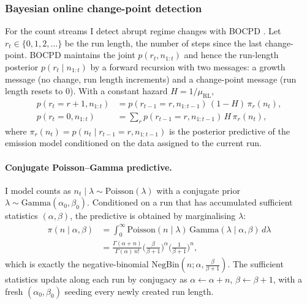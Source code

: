 \documentclass[10pt,twocolumn]{article}
\theoremstyle{definition}
\newcommand{\Pois}{\mathrm{Poisson}}
\newcommand{\Gam}{\mathrm{Gamma}}
\newcommand{\NB}{\mathrm{NegBin}}
\begin{document}
\subsubsection{Bayesian online change-point detection}
\label{sec:bocpd}
For the count streams I detect abrupt regime changes with BOCPD
\citep{adams2007}. Let $r_t\in\{0,1,2,\dots\}$ be the run length, the
number of steps since the last change-point. BOCPD maintains the joint
$p(r_t, n_{1:t})$ and hence the run-length posterior $p(r_t\mid n_{1:t})$ by a
forward recursion with two messages: a growth message (no change, run
length increments) and a change-point message (run length resets to $0$).
With a constant hazard $H=1/\mu_{\mathrm{RL}}$,
\begin{align}
p(r_t{=}r{+}1, n_{1:t}) &= p(r_{t-1}{=}r, n_{1:t-1})\,(1{-}H)\,\pi_r(n_t),\label{eq:growth}\\
p(r_t{=}0, n_{1:t}) &= \sum_{r} p(r_{t-1}{=}r, n_{1:t-1})\,H\,\pi_r(n_t),\label{eq:reset}
\end{align}
where $\pi_r(n_t)=p(n_t\mid r_{t-1}{=}r, n_{1:t-1})$ is the posterior predictive
of the emission model conditioned on the data assigned to the current run.

\paragraph{Conjugate Poisson--Gamma predictive.}
I model counts as $n_t\mid\lambda\sim\Pois(\lambda)$ with a conjugate prior
$\lambda\sim\Gam(\alpha_0,\beta_0)$. Conditioned on a run that has accumulated
sufficient statistics $(\alpha,\beta)$, the predictive is obtained by
marginalising $\lambda$:
\begin{align}
\pi(n\mid\alpha,\beta)
&= \int_0^\infty \Pois(n\mid\lambda)\,\Gam(\lambda\mid\alpha,\beta)\,d\lambda \nonumber\\
&= \frac{\Gamma(\alpha+n)}{\Gamma(\alpha)\,n!}\Big(\tfrac{\beta}{\beta+1}\Big)^{\!\alpha}\Big(\tfrac{1}{\beta+1}\Big)^{\!n},
\label{eq:nb-pred}
\end{align}
which is exactly the negative-binomial $\NB(n;\alpha,\frac{\beta}{\beta+1})$. The
sufficient statistics update along each run by conjugacy as
$\alpha\!\leftarrow\!\alpha+n$, $\beta\!\leftarrow\!\beta+1$, with a fresh
$(\alpha_0,\beta_0)$ seeding every newly created run length.
\end{document}
